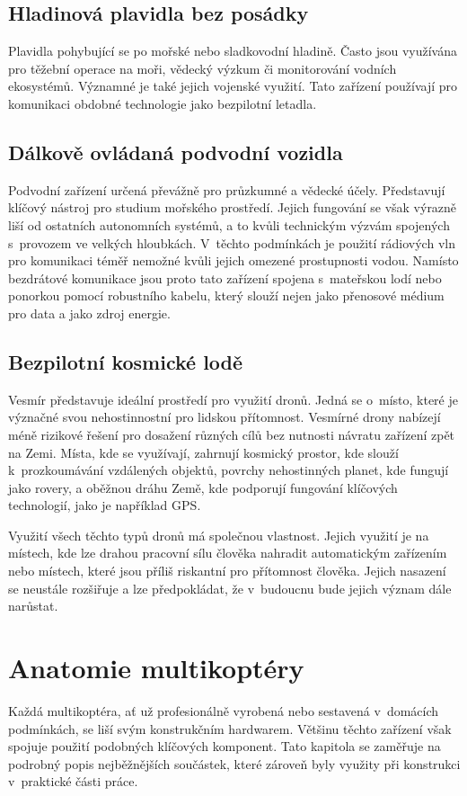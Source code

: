 \documentclass[12pt]{report}
\begin{document}
\section[Hladinová plavidla bez posádky]{Hladinová plavidla bez posádky}
Plavidla pohybující se po mořské nebo sladkovodní hladině. Často jsou využívána pro těžební operace na moři, vědecký výzkum či monitorování vodních ekosystémů. Významné je také jejich vojenské využití. Tato zařízení používají pro komunikaci obdobné technologie jako bezpilotní letadla. \cite{mainbook}

\section[Dálkově ovládaná podvodní vozidla]{Dálkově ovládaná podvodní vozidla}
Podvodní zařízení určená převážně pro průzkumné a vědecké účely. Představují klíčový nástroj pro studium mořského prostředí. Jejich fungování se však výrazně liší od ostatních autonomních systémů, a to kvůli technickým výzvám spojených s~provozem ve velkých hloubkách. V~těchto podmínkách je použití rádiových vln pro komunikaci téměř nemožné kvůli jejich omezené prostupnosti vodou. Namísto bezdrátové komunikace jsou proto tato zařízení spojena s~mateřskou lodí nebo ponorkou pomocí robustního kabelu, který slouží nejen jako přenosové médium pro data a jako zdroj energie. \cite{mainbook}

\section[Bezpilotní kosmické lodě]{Bezpilotní kosmické lodě}
Vesmír představuje ideální prostředí pro využití dronů. Jedná se o~místo, které je význačné svou nehostinnostní pro lidskou přítomnost. Vesmírné drony nabízejí méně rizikové řešení pro dosažení různých cílů bez nutnosti návratu zařízení zpět na Zemi. Místa, kde se využívají, zahrnují kosmický prostor, kde slouží k~prozkoumávání vzdálených objektů, povrchy nehostinných planet, kde fungují jako rovery, a oběžnou dráhu Země, kde podporují fungování klíčových technologií, jako je například GPS. \cite{mainbook}

Využití všech těchto typů dronů má společnou vlastnost. Jejich využití je na místech, kde lze drahou pracovní sílu člověka nahradit automatickým zařízením nebo místech, které jsou příliš riskantní pro přítomnost člověka. Jejich nasazení se neustále rozšiřuje a lze předpokládat, že v~budoucnu bude jejich význam dále narůstat.

\chapter[Anatomie multikoptéry]{Anatomie multikoptéry}
Každá multikoptéra, ať už profesionálně vyrobená nebo sestavená v~domácích podmínkách, se liší svým konstrukčním hardwarem. Většinu těchto zařízení však spojuje použití podobných klíčových komponent. Tato kapitola se zaměřuje na podrobný popis nejběžnějších součástek, které zároveň byly využity při konstrukci v~praktické části práce.
\end{document}
